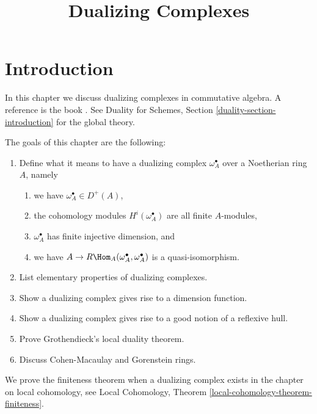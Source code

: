 

%


\title{Dualizing Complexes}


\maketitle

\label{section-phantom}

\tableofcontents

\section{Introduction}
\label{section-introduction}

\noindent
In this chapter we discuss dualizing complexes in commutative algebra.
A reference is the book \cite{RD}. See
Duality for Schemes, Section \ref{duality-section-introduction}
for the global theory.

\medskip\noindent
The goals of this chapter are the following:
\begin{enumerate}
\item Define what it means to have a dualizing complex $\omega_A^\bullet$
over a Noetherian ring $A$, namely
\begin{enumerate}
\item we have $\omega_A^\bullet \in D^{+}(A)$,
\item the cohomology modules $H^i(\omega_A^\bullet)$ are
all finite $A$-modules,
\item $\omega_A^\bullet$ has finite injective dimension, and
\item we have $A \to R\Hom_A(\omega_A^\bullet, \omega_A^\bullet)$
is a quasi-isomorphism.
\end{enumerate}
\item List elementary properties of dualizing complexes.
\item Show a dualizing complex gives rise to a dimension function.
\item Show a dualizing complex gives rise to a good notion of a
reflexive hull.
\item Prove Grothendieck's local duality theorem.
\item Discuss Cohen-Macaulay and Gorenstein rings.
\end{enumerate}
We prove the finiteness theorem when a dualizing complex exists
in the chapter on local cohomology, see
Local Cohomology, Theorem \ref{local-cohomology-theorem-finiteness}.






